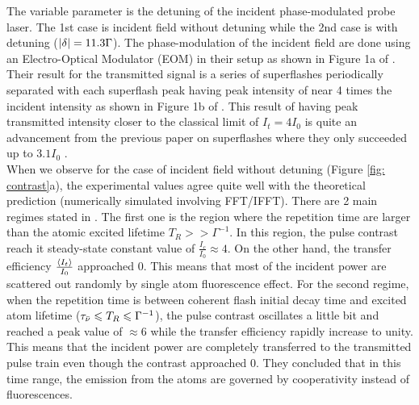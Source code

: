 The variable parameter is the detuning of the incident phase-modulated probe laser. The 1st case is incident field without detuning while the 2nd case is with detuning ($\abs{\delta} = 11.3 \Gamma$). The phase-modulation of the incident field are done using an Electro-Optical Modulator (EOM) in their setup as shown in Figure 1a of \cite{Kwong2015}. Their result for the transmitted signal is a series of superflashes periodically separated with each superflash peak having peak intensity of near 4 times the incident intensity as shown in Figure 1b of \cite{Kwong2015}. This result of having peak transmitted intensity closer to the classical limit of $I_{t} = 4 I_{0}$ is quite an advancement from the previous paper on superflashes where they only succeeded up to $3.1 I_{0}$ \cite{Kwong2014}.\\

When we observe for the case of incident field without detuning (Figure \ref{fig: contrast}a), the experimental values agree quite well with the theoretical prediction \cite{Kwong2015} (numerically simulated involving FFT/IFFT). There are 2 main regimes stated in \cite{Kwong2015}. The first one is the region where the repetition time are larger than the atomic excited lifetime $T_{R} >> \Gamma^{-1}$. In this region, the pulse contrast reach it steady-state constant value of $\frac{I_{c}}{I_{0}} \approx 4$. On the other hand, the transfer efficiency $\frac{\expval{I_{t}}}{I_{0}}$ approached 0. This means that most of the incident power are scattered out randomly by single atom fluorescence effect. For the second regime, when the repetition time is between coherent flash initial decay time and excited atom lifetime ($\tau_{\Bar{\nu}} \leqslant T_{R} \leqslant \Gamma^{-1}$), the pulse contrast oscillates a little bit and reached a peak value of $\approx 6$ while the transfer efficiency rapidly increase to unity. This means that the incident power are completely transferred to the transmitted pulse train even though the contrast approached 0. They concluded that in this time range, the emission from the atoms are governed by cooperativity instead of fluorescences.\\

